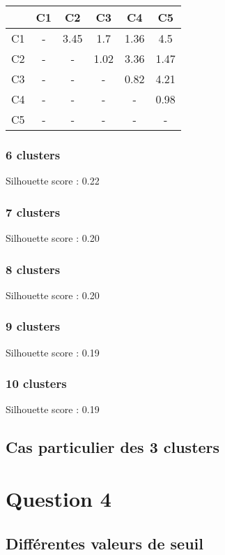 \documentclass{article}
\begin{document}
\begin{tabular}{|c|c|c|c|c|c|}
\hline
& C1 & C2 & C3 & C4 & C5 \\
\hline
C1 & - & 3.45 & 1.7 & 1.36 & 4.5 \\
\hline
C2 & - & - & 1.02 & 3.36 & 1.47 \\
\hline
C3 & - & - & - & 0.82 & 4.21 \\
\hline
C4 & - & - & - & - & 0.98 \\
\hline
C5 & - & - & - & - & - \\
\hline
\end{tabular}

\subsubsection*{6 clusters}

Silhouette score : 0.22

\subsubsection*{7 clusters}

Silhouette score : 0.20

\subsubsection*{8 clusters}

Silhouette score : 0.20

\subsubsection*{9 clusters}

Silhouette score : 0.19

\subsubsection*{10 clusters}

Silhouette score : 0.19

\subsection*{Cas particulier des 3 clusters}


\section*{Question 4}

\subsection*{Différentes valeurs de seuil}
\end{document}
